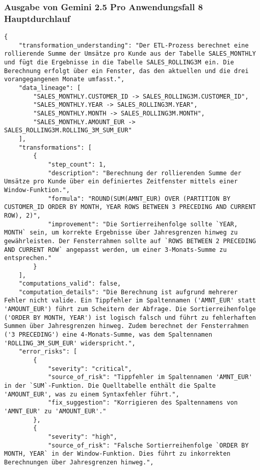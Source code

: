 \subsubsection{Ausgabe von Gemini 2.5 Pro Anwendungsfall 8 Hauptdurchlauf}\label{anhang:subsubsec:gemini_case8_prompt1}
\begin{lstlisting}[caption={Ausgabe: Gemini 2.5 Pro Anwendungsfall 8 Hauptdurchlauf},label={gemini_case8_prompt1}]
{
    "transformation_understanding": "Der ETL-Prozess berechnet eine rollierende Summe der Umsätze pro Kunde aus der Tabelle SALES_MONTHLY und fügt die Ergebnisse in die Tabelle SALES_ROLLING3M ein. Die Berechnung erfolgt über ein Fenster, das den aktuellen und die drei vorangegangenen Monate umfasst.",
    "data_lineage": [
        "SALES_MONTHLY.CUSTOMER_ID -> SALES_ROLLING3M.CUSTOMER_ID",
        "SALES_MONTHLY.YEAR -> SALES_ROLLING3M.YEAR",
        "SALES_MONTHLY.MONTH -> SALES_ROLLING3M.MONTH",
        "SALES_MONTHLY.AMOUNT_EUR -> SALES_ROLLING3M.ROLLING_3M_SUM_EUR"
    ],
    "transformations": [
        {
            "step_count": 1,
            "description": "Berechnung der rollierenden Summe der Umsätze pro Kunde über ein definiertes Zeitfenster mittels einer Window-Funktion.",
            "formula": "ROUND(SUM(AMNT_EUR) OVER (PARTITION BY CUSTOMER_ID ORDER BY MONTH, YEAR ROWS BETWEEN 3 PRECEDING AND CURRENT ROW), 2)",
            "improvement": "Die Sortierreihenfolge sollte `YEAR, MONTH` sein, um korrekte Ergebnisse über Jahresgrenzen hinweg zu gewährleisten. Der Fensterrahmen sollte auf `ROWS BETWEEN 2 PRECEDING AND CURRENT ROW` angepasst werden, um einer 3-Monats-Summe zu entsprechen."
        }
    ],
    "computations_valid": false,
    "computation_details": "Die Berechnung ist aufgrund mehrerer Fehler nicht valide. Ein Tippfehler im Spaltennamen ('AMNT_EUR' statt 'AMOUNT_EUR') führt zum Scheitern der Abfrage. Die Sortierreihenfolge ('ORDER BY MONTH, YEAR') ist logisch falsch und führt zu fehlerhaften Summen über Jahresgrenzen hinweg. Zudem berechnet der Fensterrahmen ('3 PRECEDING') eine 4-Monats-Summe, was dem Spaltennamen 'ROLLING_3M_SUM_EUR' widerspricht.",
    "error_risks": [
        {
            "severity": "critical",
            "source_of_risk": "Tippfehler im Spaltennamen 'AMNT_EUR' in der `SUM`-Funktion. Die Quelltabelle enthält die Spalte 'AMOUNT_EUR', was zu einem Syntaxfehler führt.",
            "fix_suggestion": "Korrigieren des Spaltennamens von 'AMNT_EUR' zu 'AMOUNT_EUR'."
        },
        {
            "severity": "high",
            "source_of_risk": "Falsche Sortierreihenfolge `ORDER BY MONTH, YEAR` in der Window-Funktion. Dies führt zu inkorrekten Berechnungen über Jahresgrenzen hinweg.",

\end{lstlisting}
